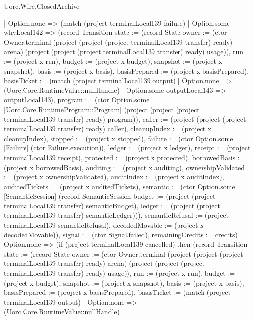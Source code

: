 \begin{lexlean}{Uorc.Wire.ClosedArchive}
\begin{semanticmodule}
{        | Option.none => (match (project terminalLocal139 failure)
          | Option.some whyLocal142 => (record Transition {state := (record State {owner := (ctor Owner.terminal (project (project (project terminalLocal139 transfer) ready) arena) (project (project (project terminalLocal139 transfer) ready) usage)), run := (project x run), budget := (project x budget), snapshot := (project x snapshot), basis := (project x basis), basisPrepared := (project x basisPrepared), basisTicket := (match (project terminalLocal139 output)
            | Option.none => (Uorc.Core.RuntimeValue::nullHandle)
            | Option.some outputLocal143 => outputLocal143), program := (ctor Option.some [Uorc.Core.RuntimeProgram::Program] (project (project (project terminalLocal139 transfer) ready) program)), caller := (project (project (project terminalLocal139 transfer) ready) caller), cleanupIndex := (project x cleanupIndex), stopped := (project x stopped), failure := (ctor Option.some [Failure] (ctor Failure.execution)), ledger := (project x ledger), receipt := (project terminalLocal139 receipt), protected := (project x protected), borrowedBasis := (project x borrowedBasis), auditing := (project x auditing), ownershipValidated := (project x ownershipValidated), auditIndex := (project x auditIndex), auditedTickets := (project x auditedTickets), semantic := (ctor Option.some [SemanticSession] (record SemanticSession {budget := (project (project terminalLocal139 transfer) semanticBudget), ledger := (project (project terminalLocal139 transfer) semanticLedger)})), semanticRefusal := (project terminalLocal139 semanticRefusal), decodedMovable := (project x decodedMovable)}), signal := (ctor Signal.failed), remainingCredits := credits})
          | Option.none => (if (project terminalLocal139 cancelled) then (record Transition {state := (record State {owner := (ctor Owner.terminal (project (project (project terminalLocal139 transfer) ready) arena) (project (project (project terminalLocal139 transfer) ready) usage)), run := (project x run), budget := (project x budget), snapshot := (project x snapshot), basis := (project x basis), basisPrepared := (project x basisPrepared), basisTicket := (match (project terminalLocal139 output)
            | Option.none => (Uorc.Core.RuntimeValue::nullHandle)
}}}
\end{semanticmodule}
\end{lexlean}
